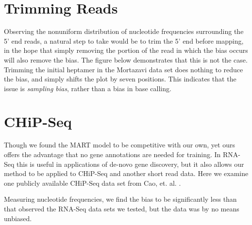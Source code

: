\documentclass[letterpaper]{article}
\begin{document}




\section{Trimming Reads}

Observing the nonuniform distribution of nucleotide frequencies surrounding the
5' end reads, a natural step to take would be to trim the 5' end before mapping,
in the hope that simply removing the portion of the read in which the bias
occurs will also remove the bias. The figure below demonstrates that this is not
the case. Trimming the initial heptamer in the Mortazavi data set does nothing to
reduce the bias, and simply shifts the plot by seven positions. This indicates
that the issue is \emph{sampling bias}, rather than a bias in base calling.


\begin{comment}
\begin{center}
\texttt{[image: fig/trimmed-freqs.pdf]}
\end{center}
\end{comment}


\section{CHiP-Seq}

Though we found the MART model \cite{Li2010} to be competitive with our own,
yet ours offers the advantage that no gene annotations are needed for training. In
RNA-Seq this is useful in applications of de-novo gene discovery, but it also
allows our method to be applied to CHiP-Seq and another short read data. Here we
examine one publicly available CHiP-Seq data set from Cao, et. al.
\cite{Cao2010}.  

Measuring nucleotide frequencies, we find the bias to be significantly less
than that observed the RNA-Seq data sets we tested, but the data was by no means
unbiased.
\end{document}
